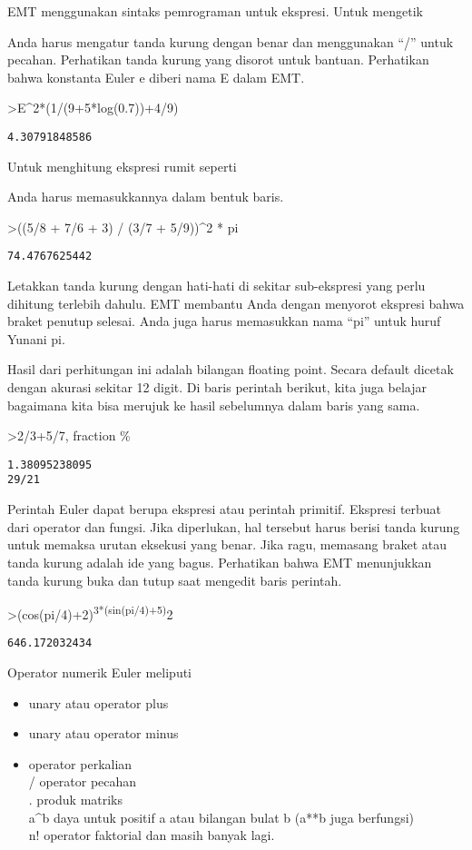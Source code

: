 \documentclass[
]{book}
\providecommand{\tightlist}{%
  \setlength{\itemsep}{0pt}\setlength{\parskip}{0pt}}
\begin{document}
EMT menggunakan sintaks pemrograman untuk ekspresi. Untuk mengetik

Anda harus mengatur tanda kurung dengan benar dan menggunakan ``/'' untuk pecahan. Perhatikan tanda kurung yang disorot untuk bantuan. Perhatikan bahwa konstanta Euler e diberi nama E dalam EMT.

\textgreater E\^{}2*(1/(9+5*log(0.7))+4/9)

\begin{verbatim}
4.30791848586
\end{verbatim}

Untuk menghitung ekspresi rumit seperti

Anda harus memasukkannya dalam bentuk baris.

\textgreater((5/8 + 7/6 + 3) / (3/7 + 5/9))\^{}2 * pi

\begin{verbatim}
74.4767625442
\end{verbatim}

Letakkan tanda kurung dengan hati-hati di sekitar sub-ekspresi yang perlu dihitung terlebih dahulu. EMT membantu Anda dengan menyorot ekspresi bahwa braket penutup selesai. Anda juga harus memasukkan nama ``pi'' untuk huruf Yunani pi.

Hasil dari perhitungan ini adalah bilangan floating point. Secara default dicetak dengan akurasi sekitar 12 digit. Di baris perintah berikut, kita juga belajar bagaimana kita bisa merujuk ke hasil sebelumnya dalam baris yang sama.

\textgreater2/3+5/7, fraction \%

\begin{verbatim}
1.38095238095
29/21
\end{verbatim}

Perintah Euler dapat berupa ekspresi atau perintah primitif. Ekspresi terbuat dari operator dan fungsi. Jika diperlukan, hal tersebut harus berisi tanda kurung untuk memaksa urutan eksekusi yang benar. Jika ragu, memasang braket atau tanda kurung adalah ide yang bagus. Perhatikan bahwa EMT menunjukkan tanda kurung buka dan tutup saat mengedit baris perintah.

\textgreater(cos(pi/4)+2)\textsuperscript{3*(sin(pi/4)+5)}2

\begin{verbatim}
646.172032434
\end{verbatim}

Operator numerik Euler meliputi

\begin{itemize}
\tightlist
\item
  unary atau operator plus\\
\item
  unary atau operator minus\\
\item
  operator perkalian\\
  / operator pecahan\\
  . produk matriks\\
  a\^{}b daya untuk positif a atau bilangan bulat b (a**b juga berfungsi)\\
  n! operator faktorial dan masih banyak lagi.
\end{itemize}
\end{document}
